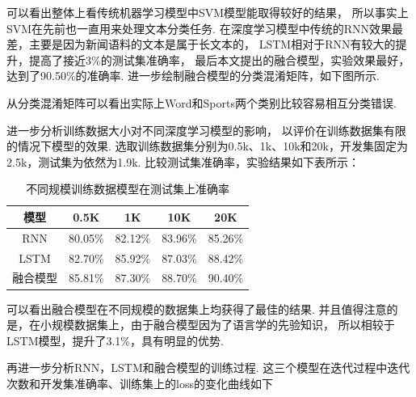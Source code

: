 \documentclass[bachelor,adobefonts]{jnuthesis}
\begin{document}
可以看出整体上看传统机器学习模型中SVM模型能取得较好的结果，
所以事实上SVM在先前也一直用来处理文本分类任务.
在深度学习模型中传统的RNN效果最差，主要是因为新闻语料的文本是属于长文本的，
LSTM相对于RNN有较大的提升，提高了接近3\%的测试集准确率，
最后本文提出的融合模型，实验效果最好，达到了90.50\%的准确率.
进一步绘制融合模型的分类混淆矩阵，如下图所示.


从分类混淆矩阵可以看出实际上Word和Sports两个类别比较容易相互分类错误.

进一步分析训练数据大小对不同深度学习模型的影响，
以评价在训练数据集有限的情况下模型的效果.
选取训练数据集分别为0.5k、1k、10k和20k，开发集固定为2.5k，测试集为依然为1.9k.
比较测试集准确率，实验结果如下表所示：

\begin{table}[h!]
  \centering
  \begin{tabular}{ccccc}
    \toprule
    \textbf{模型} & \textbf{0.5K} & \textbf{1K} & \textbf{10K} & \textbf{20K}\\
    \midrule
    RNN & 80.05\% & 82.12\% & 83.96\% & 85.26\%\\
    LSTM & 82.70\% & 85.92\% & 87.03\% & 88.42\%\\
    融合模型 & 85.81\% & 87.30\% & 88.70\% & 90.40\%\\
    \bottomrule
  \end{tabular}
  \caption{不同规模训练数据模型在测试集上准确率}
\end{table}

可以看出融合模型在不同规模的数据集上均获得了最佳的结果.
并且值得注意的是，在小规模数据集上，由于融合模型因为了语言学的先验知识，
所以相较于LSTM模型，提升了3.1\%，具有明显的优势.

再进一步分析RNN，LSTM和融合模型的训练过程.
这三个模型在迭代过程中迭代次数和开发集准确率、训练集上的loss的变化曲线如下

\end{document}
